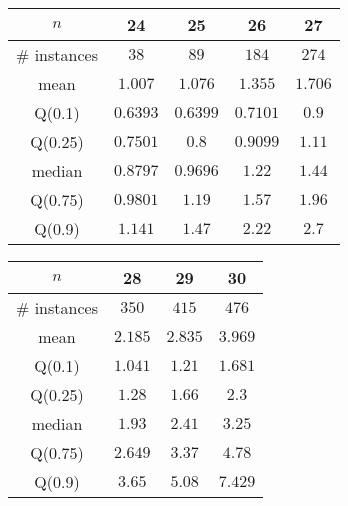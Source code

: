 \begin{tabular}{c|cccc} 
\hline 
$n$ & 24 & 25 & 26 & 27 \tabularnewline 
\hline 
\hline 
\# instances & $38$ & $89$ & $184$ & $274$ \tabularnewline 
mean & $1.007$ & $1.076$ & $1.355$ & $1.706$ \tabularnewline 
Q(0.1) & $0.6393$ & $0.6399$ & $0.7101$ & $0.9$ \tabularnewline 
Q(0.25) & $0.7501$ & $0.8$ & $0.9099$ & $1.11$ \tabularnewline 
median & $0.8797$ & $0.9696$ & $1.22$ & $1.44$ \tabularnewline 
Q(0.75) & $0.9801$ & $1.19$ & $1.57$ & $1.96$ \tabularnewline 
Q(0.9) & $1.141$ & $1.47$ & $2.22$ & $2.7$ \tabularnewline 
\hline 
\end{tabular} 
\medskip{} 

\begin{tabular}{c|ccc} 
\hline 
$n$ & 28 & 29 & 30 \tabularnewline 
\hline 
\hline 
\# instances & $350$ & $415$ & $476$ \tabularnewline 
mean & $2.185$ & $2.835$ & $3.969$ \tabularnewline 
Q(0.1) & $1.041$ & $1.21$ & $1.681$ \tabularnewline 
Q(0.25) & $1.28$ & $1.66$ & $2.3$ \tabularnewline 
median & $1.93$ & $2.41$ & $3.25$ \tabularnewline 
Q(0.75) & $2.649$ & $3.37$ & $4.78$ \tabularnewline 
Q(0.9) & $3.65$ & $5.08$ & $7.429$ \tabularnewline 
\hline 
\end{tabular} 
\medskip{} 

